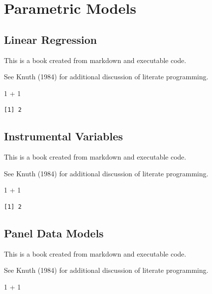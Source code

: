 \documentclass[
  letterpaper,
  DIV=11,
  numbers=noendperiod]{scrreprt}
\newenvironment{Shaded}{\begin{snugshade}}{\end{snugshade}}
\newcommand{\DecValTok}[1]{\textcolor[rgb]{0.68,0.00,0.00}{#1}}
\newcommand{\SpecialCharTok}[1]{\textcolor[rgb]{0.37,0.37,0.37}{#1}}
\theoremstyle{definition}
\theoremstyle{remark}
\begin{document}
\part{Parametric Models}

\chapter{Linear Regression}\label{linear-regression}

This is a book created from markdown and executable code.

See Knuth (1984) for additional discussion of literate programming.

\begin{Shaded}
\begin{Highlighting}[]
\DecValTok{1} \SpecialCharTok{+} \DecValTok{1}
\end{Highlighting}
\end{Shaded}

\begin{verbatim}
[1] 2
\end{verbatim}

\chapter{Instrumental Variables}\label{instrumental-variables}

This is a book created from markdown and executable code.

See Knuth (1984) for additional discussion of literate programming.

\begin{Shaded}
\begin{Highlighting}[]
\DecValTok{1} \SpecialCharTok{+} \DecValTok{1}
\end{Highlighting}
\end{Shaded}

\begin{verbatim}
[1] 2
\end{verbatim}

\chapter{Panel Data Models}\label{panel-data-models}

This is a book created from markdown and executable code.

See Knuth (1984) for additional discussion of literate programming.

\begin{Shaded}
\begin{Highlighting}[]
\DecValTok{1} \SpecialCharTok{+} \DecValTok{1}
\end{Highlighting}
\end{Shaded}
\end{document}
